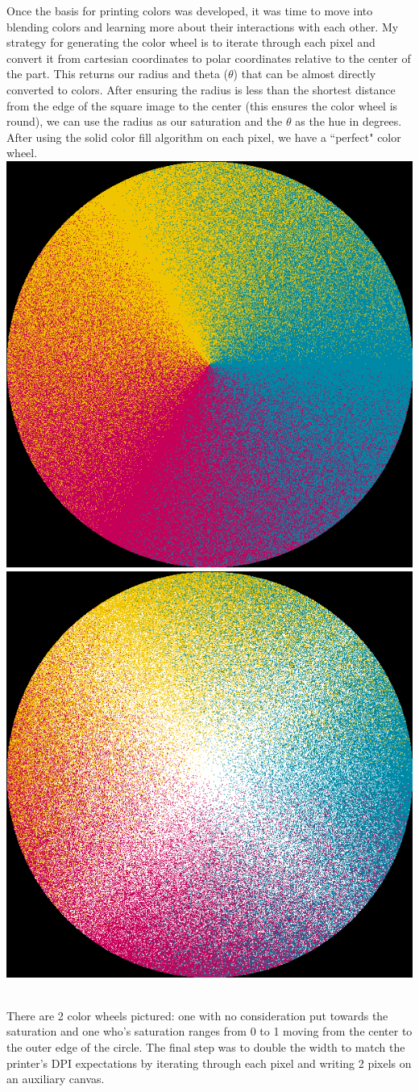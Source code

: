 \documentclass{article}
\begin{document}
\begin{multicols}{2}
Once the basis for printing colors was developed, it was time to move into blending colors and learning more about their interactions with each other. My strategy for generating the color wheel is to iterate through each pixel and convert it from cartesian coordinates to polar coordinates relative to the center of the part. This returns our radius and theta ($\theta$) that can be almost directly converted to colors. After ensuring the radius is less than the shortest distance from the edge of the square image to the center (this ensures the color wheel is round), we can use the radius as our saturation and the $\theta$ as the hue in degrees. After using the solid color fill algorithm on each pixel, we have a ``perfect" color wheel.
\\

\noindent
\includegraphics[width=.5\columnwidth]{color-wheel-no-saturation-non-scaled}
\includegraphics[width=.5\columnwidth]{color-wheel-non-scaled}
\

\noindent
There are 2 color wheels pictured: one with no consideration put towards the saturation and one who's saturation ranges from 0 to 1 moving from the center to the outer edge of the circle. The final step was to double the width to match the printer's DPI expectations by iterating through each pixel and writing 2 pixels on an auxiliary canvas.


\end{multicols}
\end{document}
